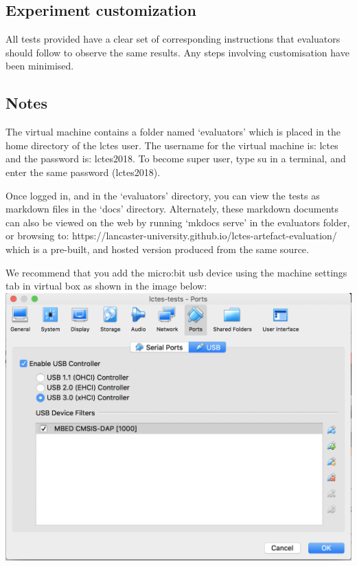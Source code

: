 {\subsection{Experiment customization}

All tests provided have a clear set of corresponding instructions that evaluators should follow to observe the same results. Any steps involving customisation have been minimised.

\subsection{Notes}

The virtual machine contains a folder named `evaluators' which is placed in the home directory of the lctes user. The username for the virtual machine is: lctes and the password is: lctes2018. To become super user, type su in a terminal, and enter the same password (lctes2018).

Once logged in, and in the `evaluators' directory, you can view the tests as markdown files in the `docs' directory. Alternately, these markdown documents can also be viewed on the web by running `mkdocs serve' in the evaluators folder, or browsing to: https://lancaster-university.github.io/lctes-artefact-evaluation/ which is a pre-built, and hosted version produced from the same source.

We recommend that you add the micro:bit usb device using the machine settings tab in virtual box as shown in the image below:\\

\includegraphics[width=\columnwidth]{images/virtualbox.png}

}
